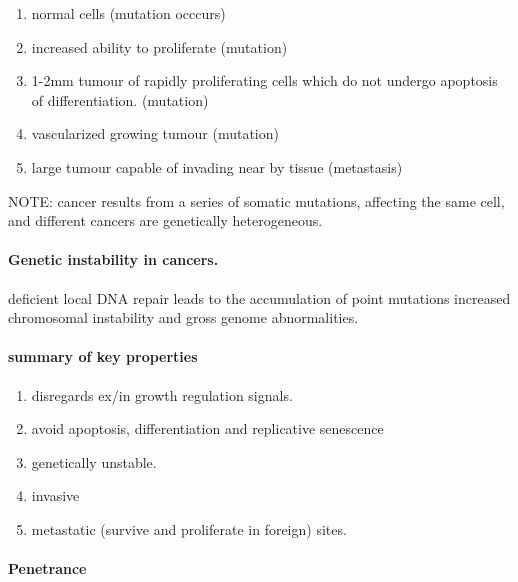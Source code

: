 \documentclass[]{article}
\providecommand{\tightlist}{%
  \setlength{\itemsep}{0pt}\setlength{\parskip}{0pt}}
\let\oldparagraph\paragraph
\renewcommand{\paragraph}[1]{\oldparagraph{#1}\mbox{}}
\begin{document}
\begin{enumerate}
\def\labelenumi{\arabic{enumi}.}
\tightlist
\item
  normal cells (mutation occcurs)
\item
  increased ability to proliferate (mutation)
\item
  1-2mm tumour of rapidly proliferating cells which do not undergo
  apoptosis of differentiation. (mutation)
\item
  vascularized growing tumour (mutation)
\item
  large tumour capable of invading near by tissue (metastasis)
\end{enumerate}

NOTE: cancer results from a series of somatic mutations, affecting the
same cell, and different cancers are genetically heterogeneous.

\hypertarget{genetic-instability-in-cancers.-1}{%
\paragraph{Genetic instability in
cancers.}\label{genetic-instability-in-cancers.-1}}

deficient local DNA repair leads to the accumulation of point mutations
increased chromosomal instability and gross genome abnormalities.

\hypertarget{summary-of-key-properties-1}{%
\paragraph{summary of key
properties}\label{summary-of-key-properties-1}}

\begin{enumerate}
\def\labelenumi{\arabic{enumi}.}
\tightlist
\item
  disregards ex/in growth regulation signals.
\item
  avoid apoptosis, differentiation and replicative senescence
\item
  genetically unstable.
\item
  invasive
\item
  metastatic (survive and proliferate in foreign) sites.
\end{enumerate}

\hypertarget{penetrance-1}{%
\paragraph{Penetrance}\label{penetrance-1}}
\end{document}
